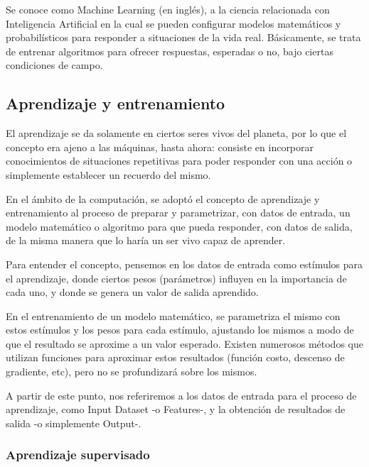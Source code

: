 \documentclass[a4paper,12pt,oneside,spanish]{book}
\begin{document}
Se conoce como Machine Learning (en inglés), a la ciencia relacionada con Inteligencia Artificial en la cual se pueden configurar modelos matemáticos y probabilísticos para responder a situaciones de la vida real. Básicamente, se trata de entrenar algoritmos para ofrecer respuestas, esperadas o no, bajo ciertas condiciones de campo.\par
	
\subsection{Aprendizaje y entrenamiento}
El aprendizaje se da solamente en ciertos seres vivos del planeta, por lo que el concepto era ajeno a las máquinas, hasta ahora: consiste en incorporar conocimientos de situaciones repetitivas para poder responder con una acción o simplemente establecer un recuerdo del mismo.\par

En el ámbito de la computación, se adoptó el concepto de aprendizaje y entrenamiento al proceso de preparar y parametrizar, con datos de entrada, un modelo matemático o algoritmo para que pueda responder, con datos de salida, de la misma manera que lo haría un ser vivo capaz de aprender.\par

Para entender el concepto, pensemos en los datos de entrada como estímulos para el aprendizaje, donde ciertos pesos (parámetros) influyen en la importancia de cada uno, y donde se genera un valor de salida aprendido.\par

En el entrenamiento de un modelo matemático, se parametriza el mismo con estos estímulos y los pesos para cada estímulo, ajustando los mismos a modo de que el resultado se aproxime a un valor esperado. Existen numerosos métodos que utilizan funciones para aproximar estos resultados (función costo, descenso de gradiente, etc), pero no se profundizará sobre los mismos. \par

A partir de este punto, nos referiremos a los datos de entrada para el proceso de aprendizaje, como Input Dataset -o Features-, y la obtención de resultados de salida -o simplemente Output-.\par

\subsubsection{Aprendizaje supervisado}
\end{document}
